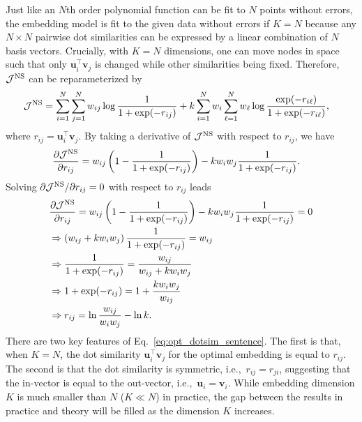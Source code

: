 \documentclass[12pt]{article} %
\def\ie{i.e.,~}
\def\vec#1{{\bm #1}}
\begin{document}
Just like an $N$th order polynomial function can be fit to $N$ points without errors, the embedding model is fit to the given data without errors if $K=N$ because any $N\times N$ pairwise dot similarities can be expressed by a linear combination of $N$ basis vectors.
Crucially, with $K=N$ dimensions, one can move nodes in space such that only $\vec{u}_i ^\top \vec{v}_j$ is changed while other similarities being fixed.
Therefore, ${\cal J}^{\text{NS}}$ can be reparameterized by
\begin{align}
    {\cal J}^{\text{NS}}
                         & = \sum_{i=1}^N \sum_{j=1}^N w_{ij} \log \frac{1}{1 + \exp(-r_{ij})} + k\sum_{i=1}^N w_{i}\sum_{\ell=1}^N w_\ell \log \frac{\exp(-r_{i\ell})}{1 + \exp(-r_{i\ell})},
\end{align}
where $r_{ij}=\vec{u}_i ^\top \vec{v}_j$.
By taking a derivative of ${\cal J}^{\text{NS}}$ with respect to $r_{ij}$, we have
\begin{align}
    \frac{\partial {\cal J}^{\text{NS}}}{\partial r_{ij}} &= w_{ij}\left(1-\frac{1}{1 + \exp(-r_{ij})}\right) - k w_i w_j\frac{1}{1 + \exp(-r_{ij})}.
\end{align}
Solving $\partial {\cal J}^{\text{NS}} /\partial r_{ij} = 0$ with respect to $r_{ij}$ leads
\begin{align}
    \label{eq:opt_dotsim_sentence}
    &\frac{\partial {\cal J}^{\text{NS}}}{\partial r_{ij}} = w_{ij}\left(1-\frac{1}{1 + \exp(-r_{ij})}\right) - k w_i w_j\frac{1}{1 + \exp(-r_{ij})} = 0 \nonumber \\
    &\Rightarrow \left(w_{ij}+ k w_i w_j\right)\frac{1}{1 + \exp(-r_{ij})} = w_{ij} \nonumber \\
    &\Rightarrow \frac{1}{1 + \exp(-r_{ij})} = \frac{w_{ij}}{w_{ij}+ k w_i w_j} \nonumber \\
    &\Rightarrow 1 + \exp(-r_{ij}) = 1+ \frac{k w_i w_j}{w_{ij}} \nonumber \\
    &\Rightarrow r_{ij} = \ln \frac{w_{ij}}{w_i w_j} - \ln k.
\end{align}
There are two key features of Eq.~\eqref{eq:opt_dotsim_sentence}.
The first is that, when $K=N$, the dot similarity $\vec{u}_i ^\top \vec{v}_j$ for the optimal embedding is equal to $r_{ij}$.
The second is that the dot similarity is symmetric, \ie $r_{ij}=r_{ji}$, suggesting that the in-vector is equal to the out-vector, \ie $\vec{u}_i = \vec{v}_i$.
While embedding dimension $K$ is much smaller than $N$ ($K\ll N$) in practice, the gap between the results in practice and theory will be filled as the dimension $K$ increases.
\end{document}
